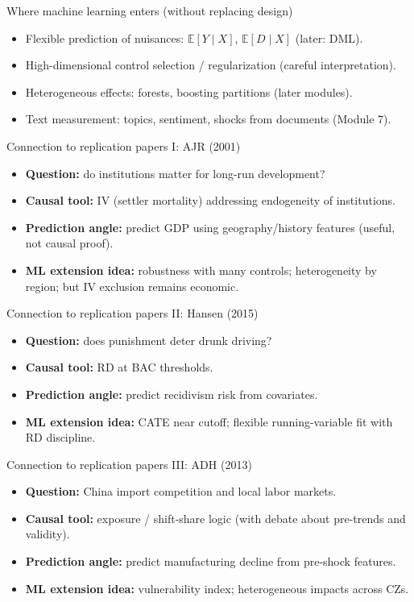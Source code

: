 \documentclass[aspectratio=169,11pt]{beamer}
\begin{document}
\begin{frame}{Where machine learning enters (without replacing design)}
  \begin{itemize}
    \item Flexible prediction of nuisances: \(\mathbb{E}[Y\mid X]\), \(\mathbb{E}[D\mid X]\) (later: DML).
    \item High-dimensional control selection / regularization (careful interpretation).
    \item Heterogeneous effects: forests, boosting partitions (later modules).
    \item Text measurement: topics, sentiment, shocks from documents (Module 7).
  \end{itemize}
\end{frame}

\begin{frame}{Connection to replication papers I: AJR (2001)}
  \begin{itemize}
    \item \textbf{Question:} do institutions matter for long-run development?
    \item \textbf{Causal tool:} IV (settler mortality) addressing endogeneity of institutions.
    \item \textbf{Prediction angle:} predict GDP using geography/history features (useful, not causal proof).
    \item \textbf{ML extension idea:} robustness with many controls; heterogeneity by region; but IV exclusion remains economic.
  \end{itemize}
\end{frame}

\begin{frame}{Connection to replication papers II: Hansen (2015)}
  \begin{itemize}
    \item \textbf{Question:} does punishment deter drunk driving?
    \item \textbf{Causal tool:} RD at BAC thresholds.
    \item \textbf{Prediction angle:} predict recidivism risk from covariates.
    \item \textbf{ML extension idea:} CATE near cutoff; flexible running-variable fit with RD discipline.
  \end{itemize}
\end{frame}

\begin{frame}{Connection to replication papers III: ADH (2013)}
  \begin{itemize}
    \item \textbf{Question:} China import competition and local labor markets.
    \item \textbf{Causal tool:} exposure / shift-share logic (with debate about pre-trends and validity).
    \item \textbf{Prediction angle:} predict manufacturing decline from pre-shock features.
    \item \textbf{ML extension idea:} vulnerability index; heterogeneous impacts across CZs.
  \end{itemize}
\end{frame}
\end{document}
